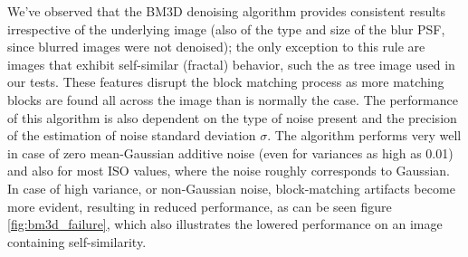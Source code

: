 \documentclass[12pt,notitlepage]{report}
\begin{document}
We've observed that the BM3D denoising algorithm provides consistent results irrespective of the underlying image (also of the type and size of the blur PSF, since blurred images were not denoised); the only exception to this rule are images that exhibit self-similar (fractal) behavior, such the as tree image used in our tests. These features disrupt the block matching process as more matching blocks are found all across the image than is normally the case. The performance of this algorithm is also dependent on the type of noise present and the precision of the estimation of noise standard deviation $\sigma$. The algorithm performs very well in case of zero mean-Gaussian additive noise (even for variances as high as 0.01) and also for most ISO values, where the noise roughly corresponds to Gaussian. In case of high variance, or non-Gaussian noise, block-matching artifacts become more evident, resulting in reduced performance, as can be seen figure \ref{fig:bm3d_failure}, which also illustrates the lowered performance on an image containing self-similarity. 
\end{document}
